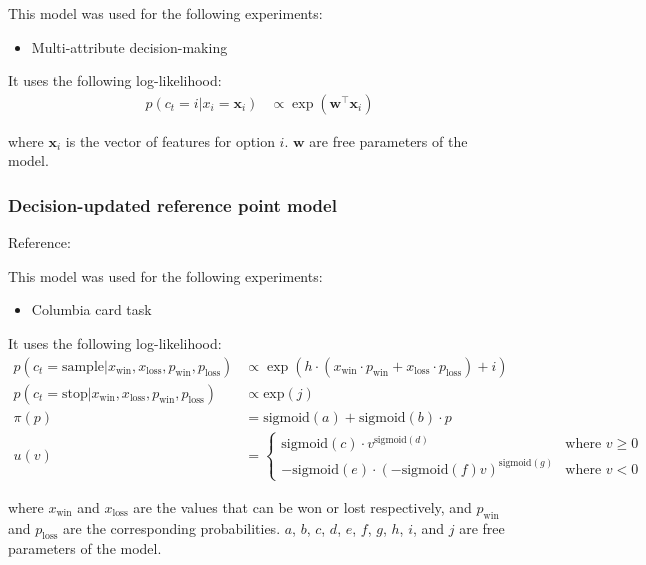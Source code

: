 \documentclass[pdflatex,sn-nature]{sn-jnl}%
\theoremstyle{thmstyleone}%
\theoremstyle{thmstyletwo}%
\theoremstyle{thmstylethree}%
\begin{document}
\noindent This model was used for the following experiments:
\begin{itemize}
    \item Multi-attribute decision-making
\end{itemize}

\noindent It uses the following log-likelihood:
\begin{align*}
    p(c_t = i | x_i = \mathbf{x}_i) &\propto \exp\left(\mathbf{w}^{\top} \mathbf{x}_i\right) 
\end{align*}

\noindent where $\mathbf{x}_i$ is the vector of features for option $i$. $\mathbf{w}$ are free parameters of the model.

\subsubsection*{Decision-updated reference point model}

Reference: \cite{pedroni2018prospect} 

\noindent This model was used for the following experiments:
\begin{itemize}
    \item Columbia card task
\end{itemize}

\noindent It uses the following log-likelihood:
\begin{align*}
    p(c_t = \text{sample} | x_{\text{win}}, x_{\text{loss}}, p_{\text{win}}, p_{\text{loss}}) &\propto \exp\left(  h \cdot \left( x_{\text{win}} \cdot p_{\text{win}} + x_{\text{loss}} \cdot p_{\text{loss}}\right) + i \right) \\
    p(c_t = \text{stop} | x_{\text{win}}, x_{\text{loss}}, p_{\text{win}}, p_{\text{loss}}) &\propto \text{exp} \left(j\right) \\
    \pi\left(p\right) &= \text{sigmoid}\left(a\right) + \text{sigmoid}\left(b\right) \cdot p\\
    u\left(v\right) &= 
    \begin{cases} 
        \text{sigmoid}\left(c\right) \cdot v^{\text{sigmoid}\left(d\right)} & \text{where }v\geq 0\\
        -\text{sigmoid}\left(e\right) \cdot \left(-\text{sigmoid}\left(f\right)v\right)^{\text{sigmoid}\left(g\right)}              & \text{where } v < 0
    \end{cases}
\end{align*}

\noindent where $x_{\text{win}}$ and $x_{\text{loss}}$ are the values that can be won or lost respectively, and $p_{\text{win}}$ and $p_{\text{loss}}$ are the corresponding probabilities. $a$, $b$, $c$, $d$, $e$, $f$, $g$, $h$, $i$, and $j$ are free parameters of the model.
\end{document}
